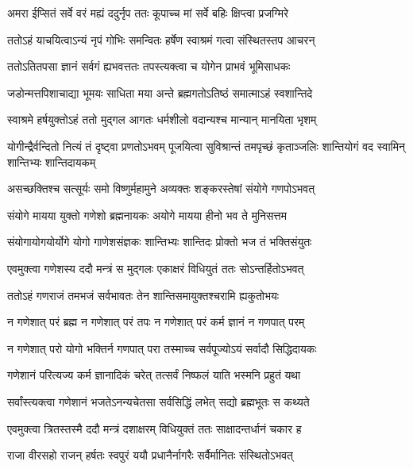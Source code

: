 \twolineshloka
{अमरा ईप्सितं सर्वे वरं मह्यं ददुर्नृप}
{ततः कूपाच्च मां सर्वे बहिः क्षिप्त्वा प्रजग्मिरे} %

\twolineshloka
{ततोऽहं याचयित्वाऽन्यं नृपं गोभिः समन्वितः}
{हर्षेण स्वाश्रमं गत्वा संस्थितस्तप आचरन्} %

\twolineshloka
{ततोऽतितपसा ज्ञानं सर्वगं ह्यभवत्ततः}
{तपस्त्यक्त्वा च योगेन प्राभवं भूमिसाधकः} %

\twolineshloka
{जडोन्मत्तपिशाचाद्या भूमयः साधिता मया}
{अन्ते ब्रह्मगतोऽतिष्ठं समात्माऽहं स्वशान्तिदे} %

\twolineshloka
{स्वाश्रमे हर्षयुक्तोऽहं ततो मुद्गल आगतः}
{धर्मशीलो वदान्यश्च मान्यान् मानयिता भृशम्} %

\threelineshloka
{योगीन्द्रैर्वन्दितो नित्यं तं दृष्ट्वा प्रणतोऽभवम्}
{पूजयित्वा सुविश्रान्तं तमपृच्छं कृताञ्जलिः}
{शान्तियोगं वद स्वामिन् शान्तिभ्यः शान्तिदायकम्} %


\twolineshloka
{असच्छक्तिश्च सत्सूर्यः समो विष्णुर्महामुने}
{अव्यक्तः शङ्करस्तेषां संयोगे गणपोऽभवत्} %

\twolineshloka
{संयोगे मायया युक्तो गणेशो ब्रह्मनायकः}
{अयोगे मायया हीनो भव ते मुनिसत्तम} %

\twolineshloka
{संयोगायोगयोर्योगे योगो गाणेशसंज्ञकः}
{शान्तिभ्यः शान्तिदः प्रोक्तो भज तं भक्तिसंयुतः} %

\twolineshloka
{एवमुक्त्वा गणेशस्य ददौ मन्त्रं स मुद्गलः}
{एकाक्षरं विधियुतं ततः सोऽन्तर्हितोऽभवत्} %

\twolineshloka
{ततोऽहं गणराजं तमभजं सर्वभावतः}
{तेन शान्तिसमायुक्तश्चरामि ह्यकुतोभयः} %

\twolineshloka
{न गणेशात् परं ब्रह्म न गणेशात् परं तपः}
{न गणेशात् परं कर्म ज्ञानं न गणपात् परम्} %

\twolineshloka
{न गणेशात् परो योगो भक्तिर्न गणपात् परा}
{तस्माच्च सर्वपूज्योऽयं सर्वादौ सिद्धिदायकः} %

\twolineshloka
{गणेशानं परित्यज्य कर्म ज्ञानादिकं चरेत्}
{तत्सर्वं निष्फलं याति भस्मनि प्रहुतं यथा} %

\twolineshloka
{सर्वांस्त्यक्त्वा गणेशानं भजतेऽनन्यचेतसा}
{सर्वसिद्धिं लभेत् सद्यो ब्रह्मभूतः स कथ्यते} %

\twolineshloka
{एवमुक्त्वा त्रितस्तस्मै ददौ मन्त्रं दशाक्षरम्}
{विधियुक्तं ततः साक्षादन्तर्धानं चकार ह} %

\twolineshloka
{राजा वीरसहो राजन् हर्षतः स्वपुरं ययौ}
{प्रधानैर्नागरैः सर्वैर्मानितः संस्थितोऽभवत्} %

